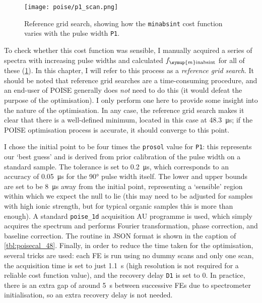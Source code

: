 \begin{figure}[htb]
    \centering
    \texttt{[image: poise/p1\_scan.png]}%
    \caption[Reference grid search for pulse width optimisation]{
        Reference grid search, showing how the \texttt{minabsint} cost function varies with the pulse width \texttt{P1}.
    }
    \label{fig:p1_scan}
\end{figure}

To check whether this cost function was sensible, I manually acquired a series of spectra with increasing pulse widths and calculated $f_{\symup{m}\text{inabsint}}$ for all of these (\cref{fig:p1_scan}).
In this chapter, I will refer to this process as a \textit{reference grid search}.
It should be noted that reference grid searches are a time-consuming procedure, and an end-user of POISE generally does \textit{not} need to do this (it would defeat the purpose of the optimisation).
I only perform one here to provide some insight into the nature of the optimisation.
In any case, the reference grid search makes it clear that there is a well-defined minimum, located in this case at \qty{48.3}{\us}; if the POISE optimisation process is accurate, it should converge to this point.

I chose the initial point to be four times the \texttt{prosol} value for \texttt{P1}: this represents our `best guess' and is derived from prior calibration of the pulse width on a standard sample.
The tolerance is set to \qty{0.2}{\us}, which corresponds to an accuracy of \qty{0.05}{\us} for the \ang{90} pulse width itself.
The lower and upper bounds are set to be \qty{8}{\us} away from the initial point, representing a `sensible' region within which we expect the null to lie (this may need to be adjusted for samples with high ionic strength, but for typical organic samples this is more than enough).
A standard \texttt{poise\_1d} acquisition AU programme is used, which simply acquires the spectrum and performs Fourier transformation, phase correction, and baseline correction.
The routine in JSON format is shown in the caption of \cref{tbl:poisecal_48}.
Finally, in order to reduce the time taken for the optimisation, several tricks are used: each FE is run using no dummy scans and only one scan, the acquisition time is set to just \qty{1.1}{\s} (high resolution is not required for a reliable cost function value), and the recovery delay \texttt{D1} is set to 0.
In practice, there is an extra gap of around \qty{5}{\s} between successive FEs due to spectrometer initialisation, so an extra recovery delay is not needed.


